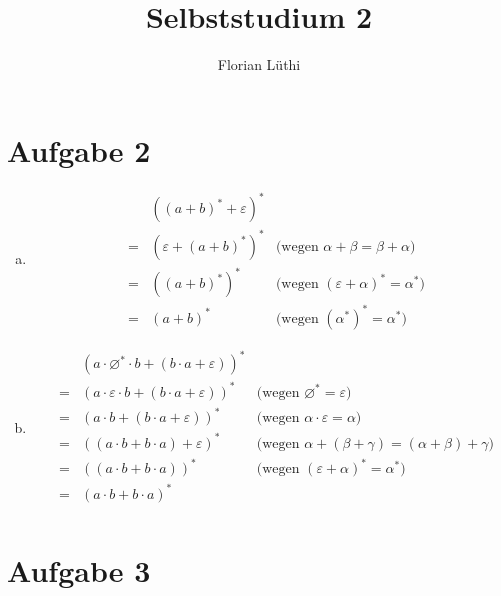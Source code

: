 \documentclass[11pt]{article} %
\title{Selbststudium 2}
\author{Florian Lüthi}
\theoremstyle{definition}
\begin{document}
\maketitle

\section*{Aufgabe 2}

\begin{enumerate}[(a)]

\item
\[
\begin{array}{rcll}
&& ((a+b)^* + \varepsilon)^* \\
&=& (\varepsilon + (a+b)^*)^* & \textrm{(wegen $\alpha + \beta = \beta + \alpha$)} \\
&=& ((a+b)^*)^* & \textrm{(wegen $(\varepsilon + \alpha)^* = \alpha^*$)} \\
&=& (a+b)^* & \textrm{(wegen $(\alpha^*)^* = \alpha^*$)}
\end{array}
\]

\item
\[
\begin{array}{rcll}
&& (a\cdot \varnothing ^* \cdot b + (b\cdot a + \varepsilon))^* \\
&=& (a \cdot \varepsilon \cdot b + (b\cdot a + \varepsilon))^* & \textrm{(wegen $\varnothing^* = \varepsilon$)} \\
&=& (a \cdot b + (b\cdot a + \varepsilon))^* & \textrm{(wegen $\alpha \cdot \varepsilon = \alpha$)} \\
&=& ((a\cdot b + b \cdot a ) + \varepsilon)^* & \textrm{(wegen $\alpha + (\beta + \gamma) = (\alpha + \beta) + \gamma$)} \\
&=& ((a\cdot b + b\cdot a))^* & \textrm{(wegen $(\varepsilon + \alpha)^* = \alpha^*$)} \\
&=& (a\cdot b + b\cdot a)^* &  \\

\end{array}
\]

\end{enumerate}

\section*{Aufgabe 3}
\end{document}

